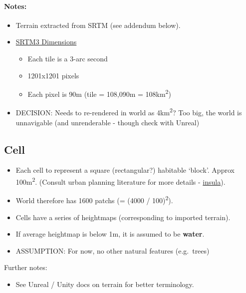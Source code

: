 \documentclass[]{article}
\begin{document}
\paragraph{Notes:}\label{notes}

\begin{itemize}
\itemsep1pt\parskip0pt
\item
  Terrain extracted from SRTM (see addendum below).
\item
  \href{http://dds.cr.usgs.gov/srtm/version2_1/Documentation/Quickstart.pdf}{SRTM3
  Dimensions}

  \begin{itemize}
  \itemsep1pt\parskip0pt
  \item
    Each tile is a 3-arc second
  \item
    1201x1201 pixels
  \item
    Each pixel is 90m (tile = 108,090m = 108km\textsuperscript{2})
  \end{itemize}
\item
  DECISION: Needs to re-rendered in world as 4km\textsuperscript{2}? Too
  big, the world is unnavigable (and unrenderable - though check with
  Unreal)
\end{itemize}

\subsection{Cell}\label{cell}

\begin{itemize}
\itemsep1pt\parskip0pt
\item
  Each cell to represent a square (rectangular?) habitable `block'.
  Approx 100m\textsuperscript{2}. (Consult urban planning literature for
  more details -
  \href{http://en.wikipedia.org/wiki/Urban_planning}{insula}).
\item
  World therefore has 1600 patchs (= (4000 / 100)\textsuperscript{2}).
\item
  Cells have a series of heightmaps (corresponding to imported terrain).
\item
  If average heightmap is below 1m, it is assumed to be \textbf{water}.
\item
  ASSUMPTION: For now, no other natural features (e.g.~trees)
\end{itemize}

Further notes:

\begin{itemize}
\itemsep1pt\parskip0pt
\item
  See Unreal / Unity docs on terrain for better terminology.
\end{itemize}
\end{document}
